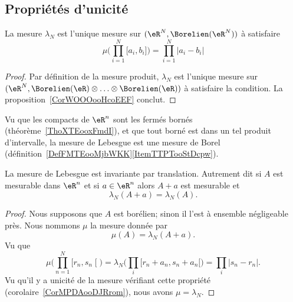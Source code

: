 	\subsection{Propriétés d'unicité}

	\begin{corollary}       \label{CorMPDAooDJRrom}
	La mesure \( \lambda_N\) est l'unique mesure sur \(   (\eR^N,  \Borelien(\eR^N) )   \) à satisfaire
	\begin{equation}
	\mu\big( \prod_{i=1}^N\mathopen[ a_i , b_i \mathclose] \big)=\prod_{i=1}^N| a_i-b_i |
	\end{equation}
	\end{corollary}

	\begin{proof}
	Par définition de la mesure produit, \( \lambda_N\) est l'unique mesure sur \(   (\eR^N,  \Borelien(\eR)\otimes\ldots\otimes\Borelien(\eR) )   \) à satisfaire la condition. La proposition~\ref{CorWOOOooHcoEEF} conclut.
	\end{proof}

	Vu que les compacts de \( \eR^n\) sont les fermés bornés (théorème~\ref{ThoXTEooxFmdI}), et que tout borné est dans un tel produit d'intervalle, la mesure de Lebesgue est une mesure de Borel (définition~\ref{DefFMTEooMjbWKK}\ref{ItemTTPTooStDcpw}).

	\begin{theorem}        \label{THOooTMWHooThsDHj}
	La mesure de Lebesgue est invariante par translation. Autrement dit si \( A\) est mesurable dans \( \eR^n\) et si \( a\in \eR^n\) alors \( A+a\) est mesurable et
	\begin{equation}
	\lambda_N(A+a)=\lambda_N(A).
	\end{equation}
	\end{theorem}

	\begin{proof}
	Nous supposons que \( A\) est borélien; sinon il l'est à ensemble négligeable près. Nous nommons \( \mu\) la mesure donnée par
	\begin{equation}
	\mu(A)=\lambda_N(A+a).
	\end{equation}
	Vu que
	\begin{equation}
	\mu\big( \prod_{n=1}^N\mathopen[ r_n , s_n \mathclose[ \big)=\lambda_N\big( \prod_i\mathopen[ r_n+a_n , s_n+a_n [ \big)=\prod_i| s_n-r_n |.
	\end{equation}
	Vu qu'il y a unicité de la mesure vérifiant cette propriété (corolaire~\ref{CorMPDAooDJRrom}), nous avons \( \mu=\lambda_N\).
	\end{proof}

